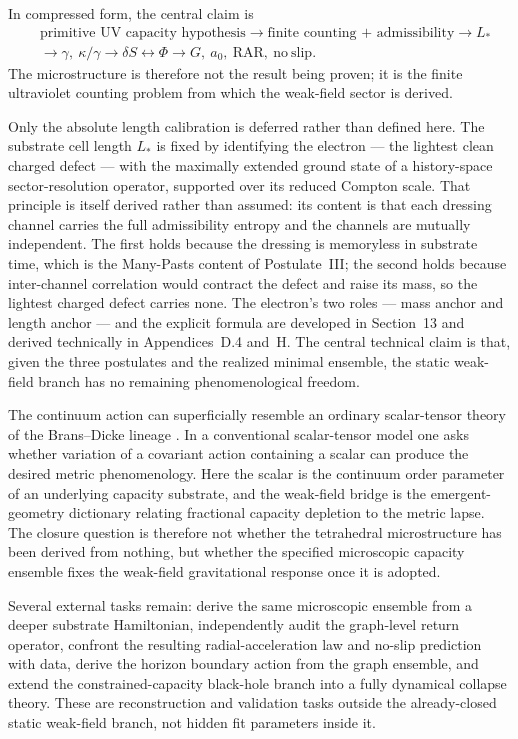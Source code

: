 \documentclass[11pt]{article}
\begin{document}
In compressed form, the central claim is
\[
\begin{aligned}
&\boxed{\text{primitive UV capacity hypothesis}}
\rightarrow
\boxed{\text{finite counting + admissibility}}
\rightarrow
\boxed{L_*}
\\
&\rightarrow
\boxed{\gamma,\ \kappa/\gamma}
\rightarrow
\boxed{\delta S \leftrightarrow \Phi}
\rightarrow
\boxed{G,\ a_0,\ \mathrm{RAR},\ \mathrm{no\ slip}}.
\end{aligned}
\]
The microstructure is therefore not the result being proven; it is the finite ultraviolet counting problem from which the weak-field sector is derived.

Only the absolute length calibration is deferred rather than defined here. The substrate cell length $L_*$ is fixed by identifying the electron --- the lightest clean charged defect --- with the maximally extended ground state of a history-space sector-resolution operator, supported over its reduced Compton scale. That principle is itself derived rather than assumed: its content is that each dressing channel carries the full admissibility entropy and the channels are mutually independent. The first holds because the dressing is memoryless in substrate time, which is the Many-Pasts content of Postulate~III; the second holds because inter-channel correlation would contract the defect and raise its mass, so the lightest charged defect carries none. The electron's two roles --- mass anchor and length anchor --- and the explicit formula are developed in Section~13 and derived technically in Appendices~D.4 and~H. The central technical claim is that, given the three postulates and the realized minimal ensemble, the static weak-field branch has no remaining phenomenological freedom.

The continuum action can superficially resemble an ordinary scalar-tensor theory of the Brans--Dicke lineage \citep{BransDicke1961}. In a conventional scalar-tensor model one asks whether variation of a covariant action containing a scalar can produce the desired metric phenomenology. Here the scalar is the continuum order parameter of an underlying capacity substrate, and the weak-field bridge is the emergent-geometry dictionary relating fractional capacity depletion to the metric lapse. The closure question is therefore not whether the tetrahedral microstructure has been derived from nothing, but whether the specified microscopic capacity ensemble fixes the weak-field gravitational response once it is adopted.

Several external tasks remain: derive the same microscopic ensemble from a deeper substrate Hamiltonian, independently audit the graph-level return operator, confront the resulting radial-acceleration law and no-slip prediction with data, derive the horizon boundary action from the graph ensemble, and extend the constrained-capacity black-hole branch into a fully dynamical collapse theory. These are reconstruction and validation tasks outside the already-closed static weak-field branch, not hidden fit parameters inside it.
\end{document}
